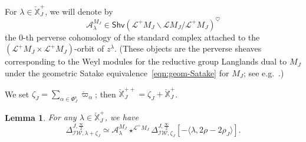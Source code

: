 \documentclass[11pt]{amsart}
\numberwithin{equation}{section}
\theoremstyle{plain}
\newtheorem{lem}[thm]{Lemma}
\theoremstyle{definition}
\newcommand{\sA}{{\mathcal A}}
\newcommand{\sL}{{\mathcal L}}
\newcommand{\X}{{\mathbb X}}
\newcommand{\Xd}{\check{\X}}
\newcommand{\semi}{{{\frac{\infty}{2}}}}
\newcommand{\IW}{\mathcal{IW}}
\newcommand{\Phis}{\Phi^{\mathrm{s}}}
\newcommand{\Shv}{\mathsf{Shv}}
\begin{document}
For $\lambda\in \Xd_J^+$, we will denote by 
\[
\sA^{M_J}_{\lambda} \in \Shv(\sL^+M_J\backslash \sL{M_J}/\sL^+M_J)^\heartsuit 
\]
the 0-th perverse cohomology of the standard complex attached to the $(\sL^+M_J\times \sL^+M_J)$-orbit of $z^\lambda$. (These objects are the perverse sheaves corresponding to the Weyl modules for the reductive group Langlands dual to $M_J$ under the geometric Satake equivalence~\eqref{eqn:geom-Satake} for $M_J$; see e.g.~\cite[\S 1.5.1]{ARbook}.)

We set $\zeta_J=\sum_{\alpha\in \Phis_J} \check{\varpi}_{\alpha}$; then $\Xd_J^{++}=\zeta_J+\Xd_J^{+}$. 

\begin{lem}
\label{lem:D-convolution}
For any $\lambda\in \Xd_J^{+}$, we have
\[
\Delta^{J,\semi}_{\IW,\lambda+\zeta_J} \simeq \sA^{M_J}_{\lambda} \star^{\sL^+M_J} \Delta^{J,\semi}_{\IW,\zeta_J} [-\langle \lambda, 2\rho-2\rho_J \rangle]. 
\]
\end{lem}
\end{document}
